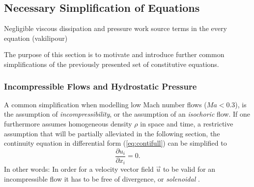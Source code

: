 
    \subsection{Necessary Simplification of Equations}
        Negligible viscous dissipation and pressure work source terms in the every equation (vakilipour)

        The purpose of this section is to motivate and introduce further common simplifications of the previously presented set of constitutive equations. 

      \subsubsection{Incompressible Flows and Hydrostatic Pressure}

      A common simplification when modelling low Mach number flows (\(Ma < 0.3\)), is the assumption of \emph{incompressibility}, or the assumption of an \emph{isochoric} flow. If one furthermore assumes homogeneous density \(\rho\) in space and time, a restrictive assumption that will be partially alleviated in the following section, the continuity equation in differential form (\ref{eq:contifull}) can be simplified to
      \begin{equation}
        \label{eq:contiinc}
        \frac{\partial u_i}{\partial x_i} = 0.
      \end{equation}
      In other words: In order for a velocity vector field \(\vec{u}\) to be valid for an incompressible flow it has to be free of divergence, or \emph{solenoidal} \cite{spurk10,aris62}.

